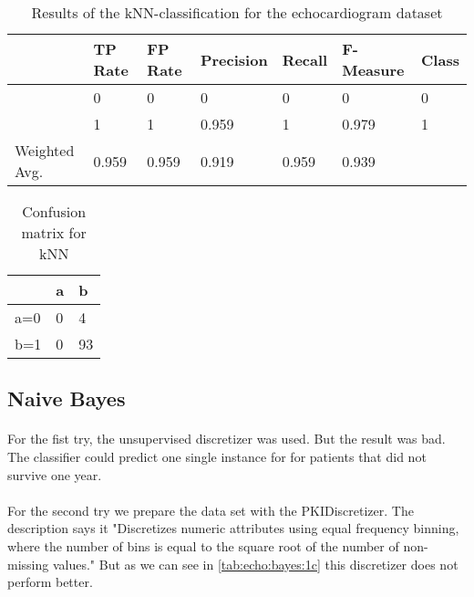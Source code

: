 \documentclass[paper=a4, fontsize=11pt]{scrartcl} %
\numberwithin{equation}{section} %
\numberwithin{figure}{section} %
\numberwithin{table}{section} %
\begin{document}
\begin{table}[h]
\centering
\begin{tabular}{lllllll}
	\toprule
									&TP Rate   	&FP Rate   &Precision &Recall  &F-Measure   &Class\\
	\midrule
									&0         	&0         &0         &0       &  0         &0\\
  								&1         	&1         &0.959     &1       &0.979       &1\\
  
	Weighted Avg.		&0.959     	&0.959     &0.919   	&0.959   &0.939     					&\\
	\bottomrule
\end{tabular}
\caption{Results of the kNN-classification for the echocardiogram dataset}
\end{table}

\vspace{6pt}

\begin{table}[h]
\centering
\begin{tabular}{|l|ll|}
\hline
 & a &	b \\
\hline
a=0 & 0 & 4 \\
b=1 & 0 & 93\\
\hline
\end{tabular}
\caption{Confusion matrix for kNN}
\end{table}


\subsection{Naive Bayes}

\paragraph{}For the fist try, the unsupervised discretizer was used. But the result was bad. The classifier could predict one single instance for for patients that did not survive one year.

\paragraph{}For the second try we prepare the data set with the PKIDiscretizer. The description says it "Discretizes numeric attributes using equal frequency binning, where the number of bins is equal to the square root of the number of non-missing values." But as we can see in \ref{tab:echo:bayes:1c} this discretizer does not perform better.
\end{document}
